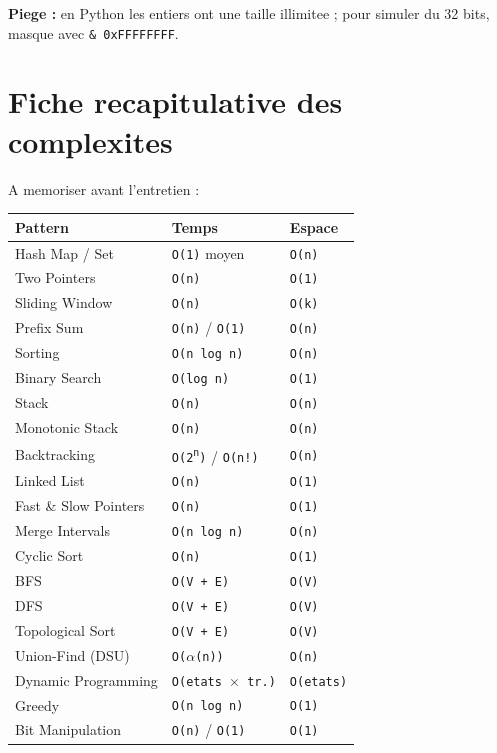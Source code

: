 \documentclass[11pt,a4paper]{article}
\begin{document}
\textbf{Piege :} en Python les entiers ont une taille illimitee ; pour simuler du
32 bits, masque avec \texttt{\& 0xFFFFFFFF}.

\newpage
\section{Fiche recapitulative des complexites}
A memoriser avant l'entretien :

\renewcommand{\arraystretch}{1.35}
\begin{longtable}{>{\raggedright\arraybackslash}p{5.2cm}
                  >{\centering\arraybackslash}p{4cm}
                  >{\centering\arraybackslash}p{3cm}}
\rowcolor{primary}
\textbf{\color{white}Pattern} & \textbf{\color{white}Temps} & \textbf{\color{white}Espace} \\
\hline
Hash Map / Set        & \texttt{O(1)} moyen          & \texttt{O(n)} \\
Two Pointers          & \texttt{O(n)}                & \texttt{O(1)} \\
Sliding Window        & \texttt{O(n)}                & \texttt{O(k)} \\
Prefix Sum            & \texttt{O(n)} / \texttt{O(1)}& \texttt{O(n)} \\
Sorting               & \texttt{O(n log n)}          & \texttt{O(n)} \\
Binary Search         & \texttt{O(log n)}            & \texttt{O(1)} \\
Stack                 & \texttt{O(n)}                & \texttt{O(n)} \\
Monotonic Stack       & \texttt{O(n)}                & \texttt{O(n)} \\
Backtracking          & \texttt{O(2\textsuperscript{n})} / \texttt{O(n!)} & \texttt{O(n)} \\
Linked List           & \texttt{O(n)}                & \texttt{O(1)} \\
Fast \& Slow Pointers & \texttt{O(n)}                & \texttt{O(1)} \\
Merge Intervals       & \texttt{O(n log n)}          & \texttt{O(n)} \\
Cyclic Sort           & \texttt{O(n)}                & \texttt{O(1)} \\
BFS                   & \texttt{O(V + E)}            & \texttt{O(V)} \\
DFS                   & \texttt{O(V + E)}            & \texttt{O(V)} \\
Topological Sort      & \texttt{O(V + E)}            & \texttt{O(V)} \\
Union-Find (DSU)      & \texttt{O($\alpha$(n))}      & \texttt{O(n)} \\
Dynamic Programming   & \texttt{O(etats $\times$ tr.)}& \texttt{O(etats)} \\
Greedy                & \texttt{O(n log n)}          & \texttt{O(1)} \\
Bit Manipulation      & \texttt{O(n)} / \texttt{O(1)}& \texttt{O(1)} \\
\end{longtable}
\end{document}
